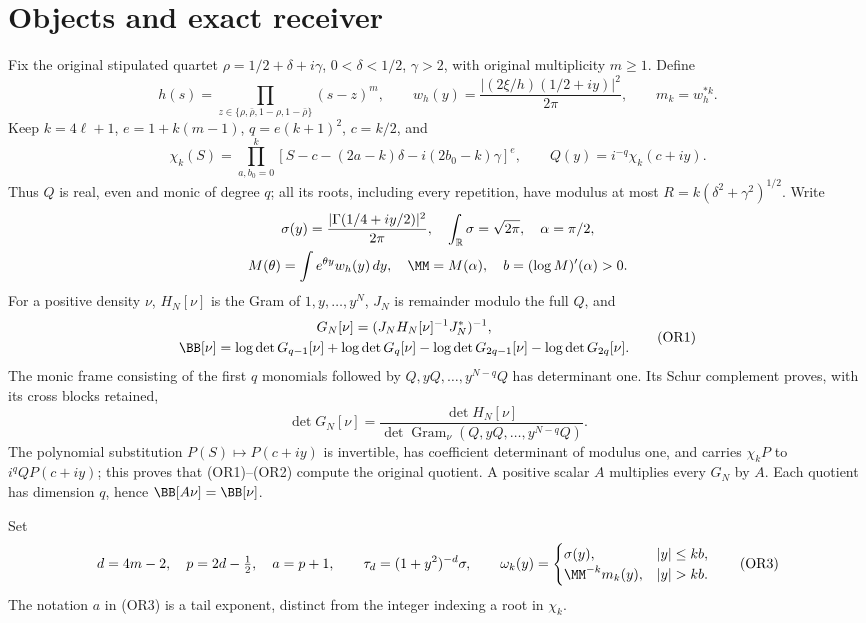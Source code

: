 \documentclass[11pt,a4paper]{article}
\begin{document}
\section{Objects and exact receiver}
Fix the original stipulated quartet
\(\rho=1/2+\delta+i\gamma\), \(0<\delta<1/2\), \(\gamma>2\),
with original multiplicity \(m\geq1\).  Define
\[
 h(s)=\prod_{z\in\{\rho,\bar\rho,1-\rho,1-\bar\rho\}}(s-z)^m,\qquad
 w_h(y)=\frac{|(2\xi/h)(1/2+iy)|^2}{2\pi},\qquad m_k=w_h^{*k}.
\]
Keep \(k=4\ell+1\), \(e=1+k(m-1)\), \(q=e(k+1)^2\), \(c=k/2\), and
\[
 \chi_k(S)=
 \prod_{a,b_0=0}^k
 [S-c-(2a-k)\delta-i(2b_0-k)\gamma]^e,\qquad
 Q(y)=i^{-q}\chi_k(c+iy).
\]
Thus \(Q\) is real, even and monic of degree \(q\); all its roots,
including every repetition, have modulus at most
\(R=k(\delta^2+\gamma^2)^{1/2}\).
Write
\[
\begin{gathered}
 \sigma(y)=\frac{|\Gamma(1/4+iy/2)|^2}{2\pi},\quad
 \int_{\mathbb R}\sigma=\sqrt{2\pi},\quad
 \alpha=\pi/2,\\
 M(\theta)=\int e^{\theta y}w_h(y)\,dy,\quad
 \MM=M(\alpha),\quad b=(\log M)'(\alpha)>0 .
\end{gathered}
\]
For a positive density \(\nu\), \(H_N[\nu]\) is the Gram of
\(1,y,\ldots,y^N\), \(J_N\) is remainder modulo the full \(Q\), and
\[
\begin{gathered}
 G_N[\nu]=(J_NH_N[\nu]^{-1}J_N^*)^{-1},\\
 \BB[\nu]=\log\det G_{q-1}[\nu]+\log\det G_q[\nu]
 -\log\det G_{2q-1}[\nu]-\log\det G_{2q}[\nu].
  \end{gathered}\tag{OR1}
\]
The monic frame consisting of the first \(q\) monomials followed by
\(Q,yQ,\ldots,y^{N-q}Q\) has determinant one.  Its Schur complement
proves, with its cross blocks retained,
\[
 \det G_N[\nu]=\frac{\det H_N[\nu]}
 {\det\operatorname{Gram}_{\nu}(Q,yQ,\ldots,y^{N-q}Q)}. \tag{OR2}
\]
The polynomial substitution \(P(S)\mapsto P(c+iy)\) is invertible, has
coefficient determinant of modulus one, and carries \(\chi_kP\) to
\(i^q QP(c+iy)\); this proves that (OR1)--(OR2) compute the original
quotient.  A positive scalar \(A\) multiplies every \(G_N\) by \(A\).
Each quotient has dimension \(q\), hence \(\BB[A\nu]=\BB[\nu]\).

Set
\[
 d=4m-2,\quad p=2d-\tfrac12,\quad a=p+1,\qquad
 \tau_d=(1+y^2)^{-d}\sigma,\qquad
 \omega_k(y)=
 \begin{cases}\sigma(y),&|y|\leq kb,\\
 \MM^{-k}m_k(y),&|y|>kb.\end{cases}                    \tag{OR3}
\]
The notation \(a\) in (OR3) is a tail exponent, distinct from the
integer indexing a root in \(\chi_k\).
\end{document}
